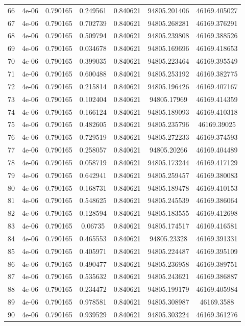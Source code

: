 \begin{table}
\begin{tabular*}{\linewidth}{c|c|c|c|c|c|c}
66 & 4e-06 & 0.790165 & 0.249561 & 0.840621 & 94805.201406 & 46169.405027\\
67 & 4e-06 & 0.790165 & 0.702739 & 0.840621 & 94805.268281 & 46169.376291\\
68 & 4e-06 & 0.790165 & 0.509794 & 0.840621 & 94805.239808 & 46169.388526\\
69 & 4e-06 & 0.790165 & 0.034678 & 0.840621 & 94805.169696 & 46169.418653\\
70 & 4e-06 & 0.790165 & 0.399035 & 0.840621 & 94805.223464 & 46169.395549\\
71 & 4e-06 & 0.790165 & 0.600488 & 0.840621 & 94805.253192 & 46169.382775\\
72 & 4e-06 & 0.790165 & 0.215814 & 0.840621 & 94805.196426 & 46169.407167\\
73 & 4e-06 & 0.790165 & 0.102404 & 0.840621 & 94805.17969 & 46169.414359\\
74 & 4e-06 & 0.790165 & 0.166124 & 0.840621 & 94805.189093 & 46169.410318\\
75 & 4e-06 & 0.790165 & 0.482605 & 0.840621 & 94805.235796 & 46169.39025\\
76 & 4e-06 & 0.790165 & 0.729519 & 0.840621 & 94805.272233 & 46169.374593\\
77 & 4e-06 & 0.790165 & 0.258057 & 0.840621 & 94805.20266 & 46169.404489\\
78 & 4e-06 & 0.790165 & 0.058719 & 0.840621 & 94805.173244 & 46169.417129\\
79 & 4e-06 & 0.790165 & 0.642941 & 0.840621 & 94805.259457 & 46169.380083\\
80 & 4e-06 & 0.790165 & 0.168731 & 0.840621 & 94805.189478 & 46169.410153\\
81 & 4e-06 & 0.790165 & 0.548625 & 0.840621 & 94805.245539 & 46169.386064\\
82 & 4e-06 & 0.790165 & 0.128594 & 0.840621 & 94805.183555 & 46169.412698\\
83 & 4e-06 & 0.790165 & 0.06735 & 0.840621 & 94805.174517 & 46169.416581\\
84 & 4e-06 & 0.790165 & 0.465553 & 0.840621 & 94805.23328 & 46169.391331\\
85 & 4e-06 & 0.790165 & 0.405971 & 0.840621 & 94805.224487 & 46169.395109\\
86 & 4e-06 & 0.790165 & 0.490477 & 0.840621 & 94805.236958 & 46169.389751\\
87 & 4e-06 & 0.790165 & 0.535632 & 0.840621 & 94805.243621 & 46169.386887\\
88 & 4e-06 & 0.790165 & 0.234472 & 0.840621 & 94805.199179 & 46169.405984\\
89 & 4e-06 & 0.790165 & 0.978581 & 0.840621 & 94805.308987 & 46169.3588\\
90 & 4e-06 & 0.790165 & 0.939529 & 0.840621 & 94805.303224 & 46169.361276\\
\end{tabular*}
\end{table}
